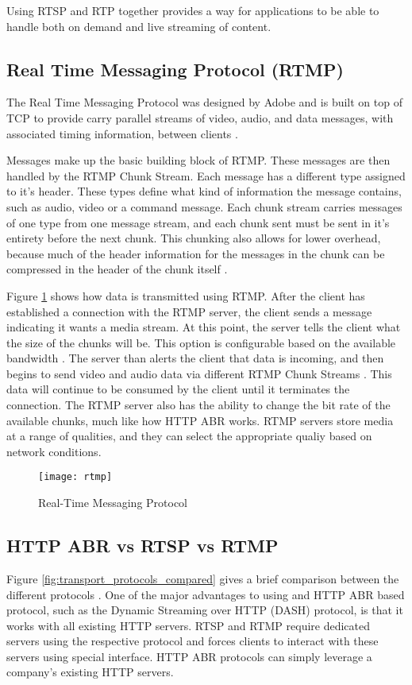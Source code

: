 \documentclass[12pt]{article}
\begin{document}
Using RTSP and RTP together provides a way for applications to be able to handle both on demand and live streaming of content.

\subsection {Real Time Messaging Protocol (RTMP)}
The Real Time Messaging Protocol was designed by Adobe and is built on top of TCP to provide carry parallel streams of video, audio, and data messages, with associated timing information, between clients \cite{rtmp_def}.

Messages make up the basic building block of RTMP.  These messages are then handled by the RTMP Chunk Stream.  Each message has a different type assigned to it's header.  These types define what kind of information the message contains, such as audio, video or a command message.  Each chunk stream carries messages of one type from one message stream, and each chunk sent must be sent in it's entirety before the next chunk.  This chunking also allows for lower overhead, because much of the header information for the messages in the chunk can be compressed in the header of the chunk itself \cite{rtmp_def}.

Figure \ref{fig:rtmp} shows how data is transmitted using RTMP.  After the client has established a connection with the RTMP server, the client sends a message indicating it wants a media stream.  At this point, the server tells the client what the size of the chunks will be.  This option is configurable based on the available bandwidth \cite{rtmp_def}.  The server than alerts the client that data is incoming, and then begins to send video and audio data via different RTMP Chunk Streams \cite{6469981}.  This data will continue to be consumed by the client until it terminates the connection.  The RTMP server also has the ability to change the bit rate of the available chunks, much like how HTTP ABR works.  RTMP servers store media at a range of qualities, and they can select the appropriate qualiy based on network conditions.

\begin{figure}[htb]
  \begin{center}
    \texttt{[image: rtmp]}
    \caption{Real-Time Messaging Protocol}
    \label{fig:rtmp}
  \end{center}
\end{figure}

\subsection{HTTP ABR vs RTSP vs RTMP}
Figure \ref{fig:transport_protocols_compared} gives a brief comparison between the different protocols \cite{transport_protocols}.  One of the major advantages to using and HTTP ABR based protocol, such as the Dynamic Streaming over HTTP (DASH) protocol, is that it works with all existing HTTP servers.  RTSP and RTMP require dedicated servers using the respective protocol and forces clients to interact with these servers using  special interface.  HTTP ABR protocols can simply leverage a company's existing HTTP servers.
\end{document}
